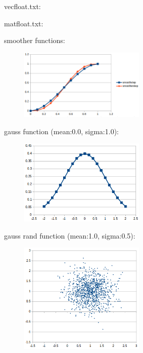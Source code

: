 vecfloat.txt:\\
\begin{scriptsize}
\begin{ttfamily}

\end{ttfamily}
\end{scriptsize}

matfloat.txt:\\
\begin{scriptsize}
\begin{ttfamily}

\end{ttfamily}
\end{scriptsize}

smoother functions:\\
\begin{center}
\begin{figure}[H]
\centering\includegraphics[width=6cm]{./smoother.png}\\
\end{figure}
\end{center}

gauss function (mean:0.0, sigma:1.0):\\
\begin{center}
\begin{figure}[H]
\centering\includegraphics[width=6cm]{./gauss.png}\\
\end{figure}
\end{center}

gauss rand function (mean:1.0, sigma:0.5):\\
\begin{center}
\begin{figure}[H]
\centering\includegraphics[width=6cm]{./gaussrnd.png}\\
\end{figure}
\end{center}

